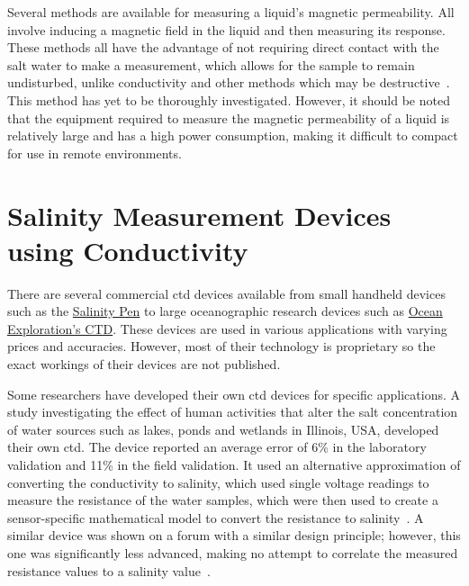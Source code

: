 Several methods are available for measuring a liquid's magnetic permeability. 
All involve inducing a magnetic field in the liquid and then measuring its response.
These methods all have the advantage of not requiring direct contact with the salt water to make a measurement, which allows for the sample to remain undisturbed, unlike conductivity and other methods which may be destructive~\cite{tengesdal_electromagnetic_salinity_2014}.
This method has yet to be thoroughly investigated. 
However, it should be noted that the equipment required to measure the magnetic permeability of a liquid is relatively large and has a high power consumption, making it difficult to compact for use in remote environments.

\section{Salinity Measurement Devices using Conductivity}\label{sec:salinity-measurement-devices}

There are several commercial \gls{ctd} devices available from small handheld devices such as the \href{https://euca.co.za/products/salinity-pen?srsltid=AfmBOorAK21_xoeOZbaqoqXbRzrLxF5Yx47nzn7tvsve-_Azl3sSh1-QbIg}{Salinity Pen} to large oceanographic research devices such as \href{https://oceanexplorer.noaa.gov/technology/ctd/ctd.html}{Ocean Exploration's CTD}.
These devices are used in various applications with varying prices and accuracies. 
However, most of their technology is proprietary so the exact workings of their devices are not published.

Some researchers have developed their own \gls{ctd} devices for specific applications.
A study investigating the effect of human activities that alter the salt concentration of water sources such as lakes, ponds and wetlands in Illinois, USA, developed their own \gls{ctd}.
The device reported an average error of 6\% in the laboratory validation and 11\% in the field validation.
It used an alternative approximation of converting the conductivity to salinity, which used single voltage readings to measure the resistance of the water samples, which were then used to create a sensor-specific mathematical model to convert the resistance to salinity~\cite{benjankar_ec_based_salt_measurement_2021}.
A similar device was shown on a forum with a similar design principle; however, this one was significantly less advanced, making no attempt to correlate the measured resistance values to a salinity value~\cite{instructables_water_salinity_meter}.

